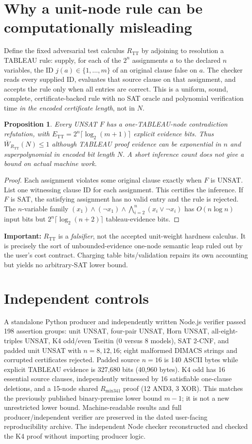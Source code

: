 \documentclass[11pt]{article}
\newtheorem{proposition}{Proposition}
\begin{document}
\section*{Why a unit-node rule can be computationally misleading}
Define the fixed adversarial test calculus $R_{\mathrm{TT}}$ by adjoining to resolution a TABLEAU rule: supply, for each of the $2^n$ assignments $a$ to the declared $n$ variables, the ID $j(a)\in\{1,\dots,m\}$ of an original clause false on $a$. The checker reads every supplied ID, evaluates that source clause on that assignment, and accepts the rule only when all entries are correct. This is a uniform, sound, complete, certificate-backed rule with no SAT oracle and polynomial verification time \emph{in the encoded certificate length}, not in $N$.
\begin{proposition}
Every UNSAT $F$ has a one-TABLEAU-node contradiction refutation, with $E_{\mathrm{TT}}=2^n\lceil\log_2(m+1)\rceil$ explicit evidence bits. Thus $\overline W_{R_{\mathrm{TT}}}(N)\le 1$ although TABLEAU proof evidence can be exponential in $n$ and superpolynomial in encoded bit length $N$. A short inference count does not give a bound on actual machine work.
\end{proposition}
\begin{proof}
Each assignment violates some original clause exactly when $F$ is UNSAT. List one witnessing clause ID for each assignment. This certifies the inference. If $F$ is SAT, the satisfying assignment has no valid entry and the rule is rejected. The $n$-variable family $(x_1)\land(\neg x_1)\land\bigwedge_{i=2}^n(x_i\vee\neg x_i)$ has $O(n\log n)$ input bits but $2^n\lceil\log_2(n+2)\rceil$ tableau-evidence bits.
\end{proof}
\noindent\textbf{Important:} $R_{\mathrm{TT}}$ is a \emph{falsifier}, not the accepted unit-weight hardness calculus. It is precisely the sort of unbounded-evidence one-node semantic leap ruled out by the user's cost contract. Charging table bits/validation repairs its own accounting but yields no arbitrary-SAT lower bound.
\section*{Independent controls}
A standalone Python producer and independently written Node.js verifier passed 198 assertion groups: unit UNSAT, four-pair UNSAT, Horn UNSAT, all-eight-triples UNSAT, K4 odd/even Tseitin (0 versus 8 models), SAT 2-CNF, and padded unit UNSAT with $n=8,12,16$; eight malformed DIMACS strings and corrupted certificates rejected. Padded source $n=16$ is 140 ASCII bytes while explicit TABLEAU evidence is 327,680 bits (40,960 bytes). K4 odd has 16 essential source clauses, independently witnessed by 16 satisfiable one-clause deletions, and a 15-node shared $R_{\mathrm{mix341}}$ proof (12 AND3, 3 XOR). This matches the previously published binary-premise lower bound $m-1$; it is not a new unrestricted lower bound. Machine-readable results and full producer/independent verifier are preserved in the dated user-facing reproducibility archive. The independent Node checker reconstructed and checked the K4 proof without importing producer logic.
\end{document}
